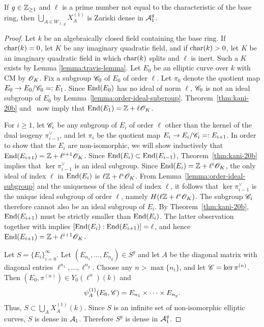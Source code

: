 \documentclass{amsart}
\begin{document}
\begin{theorem}\label{thm:curves-dense-a1}
    If $g \in \mathbb{Z}_{\ge 1}$ and $\ell$ is a
    prime number not equal to the characteristic of the base ring, then $\bigcup_{A\in W_{\ell,g}} X^{(1)}_A$ is Zariski dense in $\mathcal{A}_1^g$.
\end{theorem}
\begin{proof}
 Let $k$ be an algebraically closed field containing the base ring. 
 If $\operatorname{char}(k)=0$, let $K$ be any imaginary quadratic field, and if $\operatorname{char}(k)> 0$, let 
  $K$ be an imaginary quadratic field in which $\operatorname{char}(k)$ splits and $\ell$ is inert.
  Such a $K$ exists by Lemma \ref{lemma:travis-lemma}.
 Let $E_0$ be an elliptic curve over $k$ with CM by $\mathscr{O}_K$. 
 Fix a subgroup $\mathscr{C}_0$ of $E_0$ of order $\ell$. Let $\pi_0$ denote the quotient map $E_0 \to E_0/\mathscr{C}_0 =: E_1$. Since $\operatorname{End}(E_0)$ has no ideal of norm $\ell$, $\mathscr{C}_0$ is not an  ideal subgroup of $E_0$ by Lemma~\ref{lemma:order-ideal-subgroup}. Theorem~\ref{thm:kani-20b} and~\cite[Prop.~5]{kohel1996endomorphism} now imply that $\operatorname{End}(E_1) = \mathbb{Z} + \ell\mathscr{O}_K$.

 For $i \ge 1$, let $\mathscr{C}_i$ be any subgroup of $E_i$ of order $\ell$ other than the kernel of the dual isogeny $\pi_{i-1}^\vee$, and let $\pi_i$ be the quotient map $E_i \to E_i/\mathscr{C}_i =: E_{i+1}$. In order to show that the $E_i$ are non-isomorphic, we will show inductively that $\operatorname{End}(E_{i+1}) = \mathbb{Z} + \ell^{i+1}\mathscr{O}_{K}$. Since $\operatorname{End}(E_{i}) \subset \operatorname{End}(E_{i-1})$, Theorem~\ref{thm:kani-20b} implies that $\ker \pi_{i-1}^\vee$ is an ideal subgroup. Since $\operatorname{End}(E_{i}) = \mathbb{Z} + \ell^{i}\mathscr{O}_{K}$, the only ideal of index $\ell$ in $\operatorname{End}(E_{i})$ is $\ell\mathbb{Z} + \ell^i\mathscr{O}_K$. From Lemma~\ref{lemma:order-ideal-subgroup} and the uniqueness of the ideal of index $\ell$, it follows that $\ker \pi_{i-1}^\vee$ is the unique ideal subgroup of order $\ell$, namely $H(\ell\mathbb{Z} + \ell^i\mathscr{O}_K)$. The subgroup $\mathscr{C}_i$ therefore cannot also be an ideal subgroup of $E_i$. By Theorem~\ref{thm:kani-20b}, $\operatorname{End}(E_{i+1})$ must be strictly smaller than $\operatorname{End}(E_{i})$. The latter observation together with \cite[Prop.~5]{kohel1996endomorphism} implies $[\operatorname{End}(E_i):\operatorname{End}(E_{i+1})] = \ell$, and hence $\operatorname{End}(E_{i+1}) = \mathbb{Z} + \ell^{i+1}\mathscr{O}_{K}$.

  Let $S = \{E_i\}_{i=0}^\infty$. Let $(E_{n_1},\dots,E_{n_g}) \in S^g$ and let $A$ be the diagonal matrix with diagonal entries $\ell^{n_1},\dots,\ell^{n_g}$.  Choose any $n > \max\{n_i\}$, and let $\mathscr{C} = \ker \pi^{(n)}$. Then $(E_0,\pi^{(n)}) \in Y_0(\ell^n)(k)$ and
 \[
   \psi_{A}^{(1)}(E_0,\mathscr{C}) = E_{n_1} \times \cdots \times E_{n_g}.
 \]
Thus, $S \subset \bigcup_A X^{(1)}_A(k)$. Since $S$ is an infinite set of non-isomorphic elliptic curves, $S$ is dense in $\mathcal{A}_1$. Therefore $S^g$ is dense in $\mathcal{A}_1^g$.
\end{proof}
\end{document}
